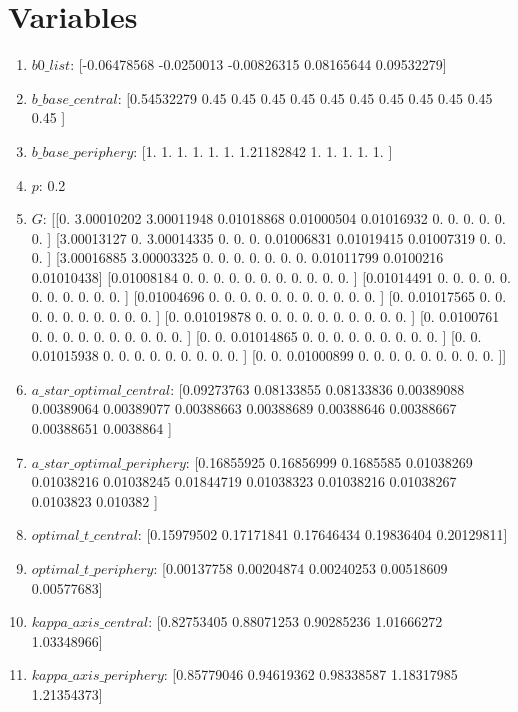 \documentclass{article}
\begin{document}
\section{Variables}
\begin{enumerate}
\item $b0\_list$: [-0.06478568 -0.0250013  -0.00826315  0.08165644  0.09532279]
\item $b\_base\_central$: [0.54532279 0.45       0.45       0.45       0.45       0.45
 0.45       0.45       0.45       0.45       0.45       0.45      ]
\item $b\_base\_periphery$: [1.         1.         1.         1.         1.         1.
 1.21182842 1.         1.         1.         1.         1.        ]
\item $p$: 0.2
\item $G$: [[0.         3.00010202 3.00011948 0.01018868 0.01000504 0.01016932
  0.         0.         0.         0.         0.         0.        ]
 [3.00013127 0.         3.00014335 0.         0.         0.
  0.01006831 0.01019415 0.01007319 0.         0.         0.        ]
 [3.00016885 3.00003325 0.         0.         0.         0.
  0.         0.         0.         0.01011799 0.0100216  0.01010438]
 [0.01008184 0.         0.         0.         0.         0.
  0.         0.         0.         0.         0.         0.        ]
 [0.01014491 0.         0.         0.         0.         0.
  0.         0.         0.         0.         0.         0.        ]
 [0.01004696 0.         0.         0.         0.         0.
  0.         0.         0.         0.         0.         0.        ]
 [0.         0.01017565 0.         0.         0.         0.
  0.         0.         0.         0.         0.         0.        ]
 [0.         0.01019878 0.         0.         0.         0.
  0.         0.         0.         0.         0.         0.        ]
 [0.         0.0100761  0.         0.         0.         0.
  0.         0.         0.         0.         0.         0.        ]
 [0.         0.         0.01014865 0.         0.         0.
  0.         0.         0.         0.         0.         0.        ]
 [0.         0.         0.01015938 0.         0.         0.
  0.         0.         0.         0.         0.         0.        ]
 [0.         0.         0.01000899 0.         0.         0.
  0.         0.         0.         0.         0.         0.        ]]
\item $a\_star\_optimal\_central$: [0.09273763 0.08133855 0.08133836 0.00389088 0.00389064 0.00389077
 0.00388663 0.00388689 0.00388646 0.00388667 0.00388651 0.0038864 ]
\item $a\_star\_optimal\_periphery$: [0.16855925 0.16856999 0.1685585  0.01038269 0.01038216 0.01038245
 0.01844719 0.01038323 0.01038216 0.01038267 0.0103823  0.010382  ]
\item $optimal\_t\_central$: [0.15979502 0.17171841 0.17646434 0.19836404 0.20129811]
\item $optimal\_t\_periphery$: [0.00137758 0.00204874 0.00240253 0.00518609 0.00577683]
\item $kappa\_axis\_central$: [0.82753405 0.88071253 0.90285236 1.01666272 1.03348966]
\item $kappa\_axis\_periphery$: [0.85779046 0.94619362 0.98338587 1.18317985 1.21354373]
\end{enumerate}
\end{document}
